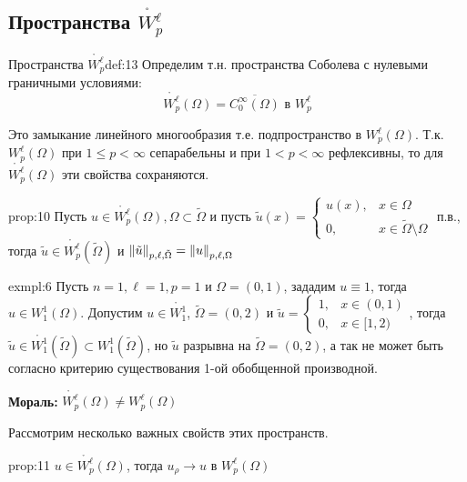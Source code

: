 \documentclass[12pt,a4paper]{article}
\begin{document}
\subsection{Пространства $\mathring{W_p^\ell}$}

\begin{definition}{Пространства $\mathring{W_p^\ell}$}{def:13}
	Определим т.н. пространства Соболева с нулевыми граничными условиями:
	\begin{equation*}
		\mathring{W_p^\ell} (\Omega) = \overline{C_0^\infty (\Omega)} \text{ в } W_p^\ell
	\end{equation*}
\end{definition}
Это замыкание линейного многообразия т.е. подпространство в $W_p^\ell (\Omega)$. Т.к. $W_p^\ell (\Omega)$ при $1 \leq p < \infty$ сепарабельны и при $1 < p < \infty$ рефлексивны, то для $\mathring{W_p^\ell} (\Omega)$ эти свойства сохраняются.

\begin{proposition}{}{prop:10}
	Пусть $u \in \mathring{W_p^\ell} (\Omega), \Omega \subset \tilde{\Omega}$ и пусть
	$\tilde{u} (x) = 
		\begin{cases}
			u(x), &x \in \Omega \\
			0, &x \in \tilde{\Omega} \setminus \Omega
	 	\end{cases}$ п.в., тогда $\tilde{u} \in \mathring{W_p^\ell} (\tilde{\Omega})$ и $\norm{\tilde{u}}_{p, \ell, \tilde{\Omega}} = \norm{u}_{p, \ell, \Omega}$
\end{proposition}

\begin{example}{}{exmpl:6}
	Пусть $n = 1, \ell = 1, p = 1$ и $\Omega = (0, 1)$, зададим $u \equiv 1$, тогда $u \in W_1^1 (\Omega)$. Допустим $u \in \mathring{W_1^1}$, $\tilde{\Omega} = (0, 2)$ и 
	$\tilde{u} = 
		\begin{cases}
			1, &x \in (0, 1) \\
			0, &x \in [1, 2)
		\end{cases}$, тогда \\ $\tilde{u} \in \mathring{W_1^1} (\tilde{\Omega}) \subset W_1^1 (\tilde{\Omega})$, но $\tilde{u}$ разрывна на $\tilde{\Omega} = (0, 2)$, а так не может быть согласно критерию существования 1-ой обобщенной производной.
\end{example}
\textbf{Мораль:} $\mathring{W_p^\ell} (\Omega) \neq W_p^\ell (\Omega)$

Рассмотрим несколько важных свойств этих пространств.
\begin{proposition}{}{prop:11}
	$u \in \mathring{W_p^\ell} (\Omega)$, тогда $u_\rho \to u$ в $W_p^\ell (\Omega)$
\end{proposition}
\end{document}
